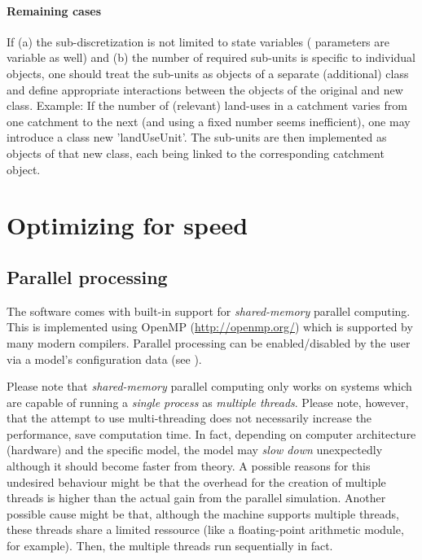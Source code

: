 \paragraph{Remaining cases} If (a) the sub-discretization is not limited to state variables (\ie{} parameters are variable as well) and (b) the number of required sub-units is specific to individual objects, one should treat the sub-units as objects of a separate (additional) class and define appropriate interactions between the objects of the original and new class. Example: If the number of (relevant) land-uses in a catchment varies from one catchment to the next (and using a fixed number seems inefficient), one may introduce a class new 'landUseUnit'. The sub-units are then implemented as objects of that new class, each being linked to the corresponding catchment object.

\section{Optimizing for speed} \label{sec:guidelines-speedOptim}

\subsection{Parallel processing} \label{sec:guidelines-speedOptim-parallel}
The  software comes with built-in support for \emph{shared-memory} parallel computing. This is implemented using OpenMP (\url{http://openmp.org/}) which is supported by many modern compilers.
Parallel processing can be enabled/disabled by the user via a model's configuration data (see ).

Please note that \emph{shared-memory} parallel computing only works on systems which are capable of running a \emph{single process} as \emph{multiple threads}. Please note, however, that the attempt to use multi-threading does not necessarily increase the performance, \ie{} save computation time. In fact, depending on computer architecture (hardware) and the specific model, the model may \emph{slow down} unexpectedly although it should become faster from theory. A possible reasons for this undesired behaviour might be that the overhead for the creation of multiple threads is higher than the actual gain from the parallel simulation. Another possible cause might be that, although the machine supports multiple threads, these threads share a limited ressource (like a floating-point arithmetic module, for example). Then, the multiple threads run sequentially in fact.


